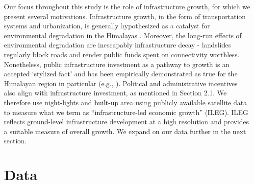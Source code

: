\documentclass[a4paper,12pt]{article}
\begin{document}
Our focus throughout this study is the role of infrastructure growth, for which we present several motivations. Infrastructure growth, in the form of transportation systems and urbanization, is generally hypothesized as a catalyst for environmental degradation in the Himalayas \parencite{prashar2023,singh2005}. Moreover, the long-run effects of environmental degradation are inescapably infrastructure decay - landslides regularly block roads \parencite{mey2023} and render public funds spent on connectivity worthless. Nonetheless, public infrastructure investment as a pathway to growth is an accepted ‘stylized fact’ and has been empirically demonstrated as true for the Himalayan region in particular (e.g., \cite{tiwari2000}). Political and administrative incentives also align with infrastructure investment, as mentioned in Section 2.1. We therefore use night-lights and built-up area using publicly available satellite data to measure what we term as “infrastructure-led economic growth” (ILEG). ILEG reflects ground-level infrastructure development at a high resolution and provides a suitable measure of overall growth. We expand on our data further in the next section.


\section{Data}



\end{document}
